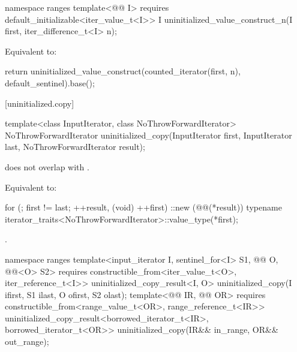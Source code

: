 %
\begin{itemdecl}
namespace ranges {
  template<@@ I>
      requires default_initializable<iter_value_t<I>>
    I uninitialized_value_construct_n(I first, iter_difference_t<I> n);
}
\end{itemdecl}

\begin{itemdescr}
\pnum
\effects
Equivalent to:
\begin{codeblock}
return uninitialized_value_construct(counted_iterator(first, n),
                                     default_sentinel).base();
\end{codeblock}
\end{itemdescr}

[uninitialized.copy]{}

%
\begin{itemdecl}
template<class InputIterator, class NoThrowForwardIterator>
  NoThrowForwardIterator uninitialized_copy(InputIterator first, InputIterator last,
                                            NoThrowForwardIterator result);
\end{itemdecl}

\begin{itemdescr}
\pnum
\expects
{} does not overlap with .

\pnum
\effects
Equivalent to:
\begin{codeblock}
for (; first != last; ++result, (void) ++first)
  ::new (@@(*result))
    typename iterator_traits<NoThrowForwardIterator>::value_type(*first);
\end{codeblock}

\pnum
\returns
{}.
\end{itemdescr}

%
\begin{itemdecl}
namespace ranges {
  template<input_iterator I, sentinel_for<I> S1,
           @@ O, @@<O> S2>
      requires constructible_from<iter_value_t<O>, iter_reference_t<I>>
    uninitialized_copy_result<I, O>
      uninitialized_copy(I ifirst, S1 ilast, O ofirst, S2 olast);
  template<@@ IR, @@ OR>
      requires constructible_from<range_value_t<OR>, range_reference_t<IR>>
    uninitialized_copy_result<borrowed_iterator_t<IR>, borrowed_iterator_t<OR>>
      uninitialized_copy(IR&& in_range, OR&& out_range);
}
\end{itemdecl}

